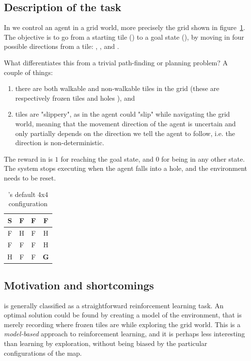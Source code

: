 \subsection{Description of the task}
In  we control an agent in a grid world, more precisely the grid shown in figure~\ref{tab:FrozenLakev0}. The objective is to go from a starting tile () to a goal state (), by moving in four possible directions from a tile: , ,  and .

What differentiates this from a trivial path-finding or planning problem? A couple of things:
\begin{enumerate}
	\item there are both walkable and non-walkable tiles in the grid (these are respectively frozen tiles  and holes ), and
	\item tiles are "slippery", as in the agent could "slip" while navigating the grid world, meaning that the movement direction of the agent is uncertain and only partially depends on the direction we tell the agent to follow, i.e. the direction is non-deterministic.
\end{enumerate}

The reward in  is $1$ for reaching the goal state, and $0$ for being in any other state. The system stops executing when the agent falls into a hole, and the environment needs to be reset.

\begin{table}[]
\centering
\begin{tabular}{|c|c|c|c|}
\hline
\cellcolor[HTML]{68CBD0}\textbf{S} & F & F & F \\ \hline
F & \cellcolor[HTML]{CE6301}H & F & \cellcolor[HTML]{CE6301}H \\ \hline
F & F & F & \cellcolor[HTML]{CE6301}H \\ \hline
\cellcolor[HTML]{CE6301}H & F & F & \cellcolor[HTML]{32CB00}\textbf{G} \\ \hline
\end{tabular}
\caption{'s default 4x4 configuration}
\label{tab:FrozenLakev0}
\end{table}

\subsection{Motivation and shortcomings}
\label{movationandshortcomings}
 is generally classified as a straightforward reinforcement learning task. An optimal solution could be found by creating a model of the environment, that is merely recording where frozen tiles are while exploring the grid world. This is a \emph{model-based} approach to reinforcement learning, and it is perhaps less interesting than learning by exploration, without being biased by the particular configurations of the map.

